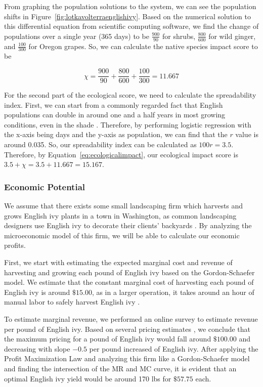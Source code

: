 From graphing the population solutions to the system, we can see the population shifts in Figure~\ref{fig:lotkavolterraenglishivy}. Based on the numerical solution to this differential equation from scientific computing software, we find the change of populations over a single year (365 days) to be \(\frac{900}{90}\) for shrubs, \(\frac{800}{600}\) for wild ginger, and \(\frac{100}{300}\) for Oregon grapes. So, we can calculate the native species impact score to be

\[\chi = \frac{900}{90} + \frac{800}{600} + \frac{100}{300} = 11.667\]

For the second part of the ecological score, we need to calculate the spreadability index. First, we can start from a commonly regarded fact that English populations can double in around one and a half years in most growing conditions, even in the shade \cite{usdaHederaHelix}. Therefore, by performing logistic regression with the x-axis being days and the y-axis as population, we can find that the \(r\) value is around 0.035. So, our spreadability index can be calculated as \(100r = 3.5\). Therefore, by Equation~\ref{eq:ecologicalimpact}, our ecological impact score is \(3.5 + \chi = 3.5 + 11.667 = 15.167\).

\subsubsection{Economic Potential}
We assume that there exists some small landscaping firm which harvests and grows English ivy plants in a town in Washington, as common landscaping designers use English ivy to decorate their clients' backyards \cite{psuEnglishLandscape}. By analyzing the microeconomic model of this firm, we will be able to calculate our economic profits.

First, we start with estimating the expected marginal cost and revenue of harvesting and growing each pound of English ivy based on the Gordon-Schaefer model. We estimate that the constant marginal cost of harvesting each pound of English ivy is around \(\$15.00\), as in a larger operation, it takes around an hour of manual labor to safely harvest English ivy \cite{bhgCaringEasytoGrow}. 

To estimate marginal revenue, we performed an online survey to estimate revenue per pound of English ivy. Based on several pricing estimates \cite{gardengoodsdirectEnglish}, we conclude that the maximum pricing for a pound of English ivy would fall around \(\$100.00\) and decreasing with slope \(-0.5\) per pound increased of English ivy. After applying the Profit Maximization Law and analyzing this firm like a Gordon-Schaefer model and finding the intersection of the MR and MC curve, it is evident that an optimal English ivy yield would be around 170 lbs for \(\$57.75\) each. 

